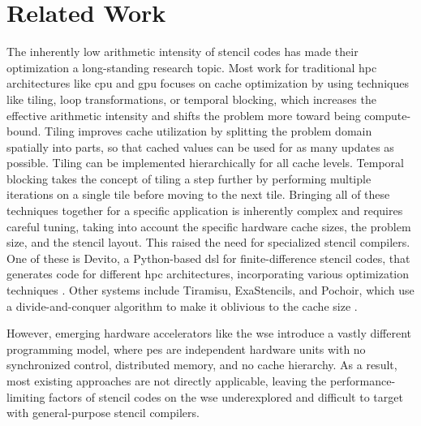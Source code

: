 \chapter{Related Work}
The inherently low arithmetic intensity of stencil codes has made their optimization a long-standing research topic.
Most work for traditional \ac{hpc} architectures like \ac{cpu} and \ac{gpu} focuses on cache optimization by using techniques like tiling, loop transformations, or temporal blocking, which increases the effective arithmetic intensity and shifts the problem more toward being compute-bound.
Tiling improves cache utilization by splitting the problem domain spatially into parts, so that cached values can be used for as many updates as possible.
Tiling can be implemented hierarchically for all cache levels.
Temporal blocking takes the concept of tiling a step further by performing multiple iterations on a single tile before moving to the next tile.
Bringing all of these techniques together for a specific application is inherently complex and requires careful tuning, taking into account the specific hardware cache sizes, the problem size, and the stencil layout.
This raised the need for specialized stencil compilers.
One of these is Devito, a Python-based \ac{dsl} for finite-difference stencil codes, that generates code for different \ac{hpc} architectures, incorporating various optimization techniques \cite{lange2016devito}. 
Other systems include Tiramisu, ExaStencils, and Pochoir, which use a divide-and-conquer algorithm to make it oblivious to the cache size \cite{baghdadi2019tiramisu,lengauer2014exastencils,tang2011pochoir}.

However, emerging hardware accelerators like the \ac{wse} introduce a vastly different programming model, where \acp{pe} are independent hardware units with no synchronized control, distributed memory, and no cache hierarchy.
As a result, most existing approaches are not directly applicable, leaving the performance-limiting factors of stencil codes on the \ac{wse} underexplored and difficult to target with general-purpose stencil compilers.

